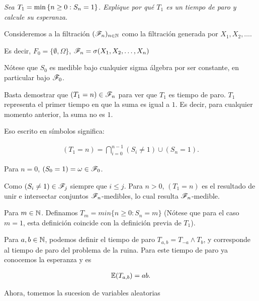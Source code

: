 \emph
{
	Sea $T_1=\min\left\{ n\geq 0:S_n=1\right\} $. Explique por qu\'e $T_1$ es un 
	tiempo de paro y calcule su esperanza.
}
\afterstatement

	Consideremos a la filtración $(\mathscr{F}_n)_{n\in\mathbb{N}}$ como la filtración 
	generada por $X_1, X_2, \dots$.\par\null

	Es decir, $F_0 = \{\emptyset, \Omega\}$, $\mathscr{F}_n = \sigma(X_1, X_2, \dots, X_n)$\par\null

	Nótese que $S_0$ es medible bajo cualquier sigma álgebra por ser constante, en particular bajo
	$\mathscr{F}_0$.\par\null

	Basta demostrar que $(T_1 = n) \in \mathscr{F}_n$ para ver que $T_1$ es tiempo de paro. $T_1$ 
	representa el primer tiempo en que la suma es igual a $1$. Es decir, para cualquier 
	momento anterior, la suma no es $1$.\par\null

	Eso escrito en símbolos significa:

    \begin{align}
        (T_1 = n) = \bigcap_{i=0}^{n-1}(S_i \not= 1) \cup (S_n = 1).
    \end{align}\par\null

	Para $n=0$, $(S_0 = 1) = \omega \in \mathscr{F}_0$.\par\null

	Como $(S_i \not= 1) \in \mathscr{F}_j$ siempre que $i \leq j$. Para $n>0$, $(T_1 = n)$ es el resultado de 
	unir e intersectar conjuntos $\mathscr{F}_n$-medibles, lo cual resulta $\mathscr{F}_n$-medible.\par\null

	Para $m \in \mathbb{N}$. Definamos $T_m = min\{n \geq 0 : S_n = m\}$ 
	(Nótese que para el caso $m=1$, esta definición	coincide con la definición previa de $T_1$).\par\null
	
	Para $a,b \in \mathbb{N}$, podemos definir el tiempo de paro $T_{a,b} = T_{-a} \wedge T_b$, y 
	corresponde al 	tiempo de paro del problema de la ruina. Para este tiempo de paro ya conocemos 
	la esperanza y es
	
    \begin{align}
        \mathbb{E}(T_{a,b}) = ab.
    \end{align}\par\null
	
	Ahora, tomemos la sucesion de variables aleatorias
    
